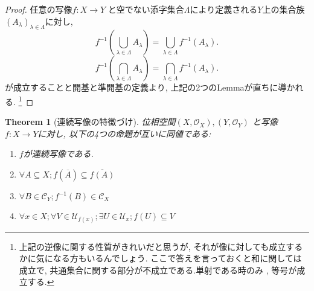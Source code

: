 \documentclass[lualatex]{ltjsbook}
\newcommand{\cl}[1]{\overline{ #1}  }
\newtheorem{theorem}{Theorem}[chapter]
\theoremstyle{remark}
\theoremstyle{plain}
\begin{document}
\begin{proof}
	任意の写像$f: X \to Y$ と空でない添字集合$\Lambda$により定義される$Y$上の集合族 $\left( A_{\lambda} \right) _{\lambda \in \Lambda}$に対し, 
	\[
	f^{-1}\left( \bigcup_{\lambda \in \Lambda} A_{\lambda}  \right) = \bigcup_{\lambda \in \Lambda} f^{-1}\left( A_\lambda \right) 
	.\] 
	\[
	f^{-1}\left( \bigcap_{\lambda \in \Lambda} A_{\lambda}  \right) = \bigcap_{\lambda \in \Lambda} f^{-1}\left( A_\lambda \right) 
	.\]
	が成立することと開基と準開基の定義より,  上記の2つのLemmaが直ちに導かれる. 
	\footnote{上記の逆像に関する性質がきれいだと思うが,  それが像に対しても成立するかに気になる方もいるんでしょう. 
	ここで答えを言っておくと和に関しては成立で,  共通集合に関する部分が{\color{red}不成立}である.単射である時のみ ,  等号が成立する.}
\end{proof}


\begin{theorem}[連続写像の特徴づけ]
	位相空間$\left( X, \mathcal{O}_X \right) , \left( Y, \mathcal{O}_Y \right) $ と写像$f:X \to Y$に対し,  以下の4つの命題が互いに同値である:
	\begin{enumerate}
		\item $f$が連続写像である.
		\item  $\forall A \subseteq X ; f\left( \cl{A} \right) \subseteq \cl{f\left( A \right) }$ 
		\item $\forall B \in \mathcal{C}_Y; f^{-1}\left( B \right)  \in \mathcal{C}_X$ 
		\item $\forall x \in X; \forall V \in \mathcal{U}_{f(x)};\exists U \in \mathcal{U}_x; f(U) \subseteq V $
	\end{enumerate}
\end{theorem}
\end{document}
